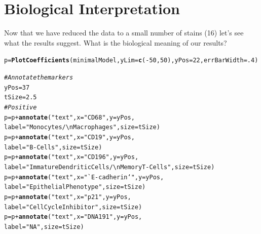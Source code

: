 \documentclass[a4paper]{article}\usepackage[]{graphicx}\usepackage[]{color}
\makeatletter
\newcommand{\hlnum}[1]{\textcolor[rgb]{0.686,0.059,0.569}{#1}}%
\newcommand{\hlstr}[1]{\textcolor[rgb]{0.192,0.494,0.8}{#1}}%
\newcommand{\hlcom}[1]{\textcolor[rgb]{0.678,0.584,0.686}{\textit{#1}}}%
\newcommand{\hlopt}[1]{\textcolor[rgb]{0,0,0}{#1}}%
\newcommand{\hlstd}[1]{\textcolor[rgb]{0.345,0.345,0.345}{#1}}%
\newcommand{\hlkwb}[1]{\textcolor[rgb]{0.69,0.353,0.396}{#1}}%
\newcommand{\hlkwc}[1]{\textcolor[rgb]{0.333,0.667,0.333}{#1}}%
\newcommand{\hlkwd}[1]{\textcolor[rgb]{0.737,0.353,0.396}{\textbf{#1}}}%
\newenvironment{kframe}{%
 \def\at@end@of@kframe{}%
 \ifinner\ifhmode%
  \def\at@end@of@kframe{\end{minipage}}%
  \begin{minipage}{\columnwidth}%
 \fi\fi%
 \def\FrameCommand##1{\hskip\@totalleftmargin \hskip-\fboxsep
 \colorbox{shadecolor}{##1}\hskip-\fboxsep
     \hskip-\linewidth \hskip-\@totalleftmargin \hskip\columnwidth}%
 \MakeFramed {\advance\hsize-\width
   \@totalleftmargin\z@ \linewidth\hsize
   \@setminipage}}%
 {\par\unskip\endMakeFramed%
 \at@end@of@kframe}
\newenvironment{knitrout}{}{} %
\makeatother
\begin{document}
\section{Biological Interpretation}
Now that we have reduced the data to a small number of stains (16) let's see what the results suggest. What is the biological meaning of our results?
\begin{knitrout}
\color{fgcolor}\begin{kframe}
\begin{alltt}
\hlstd{p} \hlkwb{=} \hlkwd{PlotCoefficients}\hlstd{(minimalModel,}\hlkwc{yLim}\hlstd{=}\hlkwd{c}\hlstd{(}\hlopt{-}\hlnum{50}\hlstd{,}\hlnum{50}\hlstd{),}\hlkwc{yPos}\hlstd{=}\hlnum{22}\hlstd{,}\hlkwc{errBarWidth}\hlstd{=}\hlnum{.4}\hlstd{)}

\hlcom{# Annotate the markers}
\hlstd{yPos} \hlkwb{=} \hlnum{37}
\hlstd{tSize} \hlkwb{=} \hlnum{2.5}
\hlcom{# Positive}
\hlstd{p} \hlkwb{=} \hlstd{p} \hlopt{+} \hlkwd{annotate}\hlstd{(}\hlstr{"text"}\hlstd{,} \hlkwc{x} \hlstd{=} \hlstr{"CD68"}\hlstd{,} \hlkwc{y} \hlstd{= yPos,}
                       \hlkwc{label} \hlstd{=} \hlstr{"Monocytes/\textbackslash{}n Macrophages"}\hlstd{,} \hlkwc{size} \hlstd{= tSize)}
\hlstd{p} \hlkwb{=} \hlstd{p} \hlopt{+} \hlkwd{annotate}\hlstd{(}\hlstr{"text"}\hlstd{,} \hlkwc{x} \hlstd{=} \hlstr{"CD19"}\hlstd{,} \hlkwc{y} \hlstd{= yPos,}
                       \hlkwc{label} \hlstd{=} \hlstr{"B-Cells"}\hlstd{,} \hlkwc{size} \hlstd{= tSize)}
\hlstd{p} \hlkwb{=} \hlstd{p} \hlopt{+} \hlkwd{annotate}\hlstd{(}\hlstr{"text"}\hlstd{,} \hlkwc{x} \hlstd{=} \hlstr{"CD196"}\hlstd{,} \hlkwc{y} \hlstd{= yPos,}
                       \hlkwc{label} \hlstd{=} \hlstr{"Immature Dendritic Cells/\textbackslash{}n Memory T-Cells"}\hlstd{,} \hlkwc{size} \hlstd{= tSize)}
\hlstd{p} \hlkwb{=} \hlstd{p} \hlopt{+} \hlkwd{annotate}\hlstd{(}\hlstr{"text"}\hlstd{,} \hlkwc{x} \hlstd{=} \hlstr{"`E-cadherin`"}\hlstd{,} \hlkwc{y} \hlstd{= yPos,}
                       \hlkwc{label} \hlstd{=} \hlstr{"Epithelial Phenotype"}\hlstd{,} \hlkwc{size} \hlstd{= tSize)}
\hlstd{p} \hlkwb{=} \hlstd{p} \hlopt{+} \hlkwd{annotate}\hlstd{(}\hlstr{"text"}\hlstd{,} \hlkwc{x} \hlstd{=} \hlstr{"p21"}\hlstd{,} \hlkwc{y} \hlstd{= yPos,}
                       \hlkwc{label} \hlstd{=} \hlstr{"Cell Cycle Inhibitor"}\hlstd{,} \hlkwc{size} \hlstd{= tSize)}
\hlstd{p} \hlkwb{=} \hlstd{p} \hlopt{+} \hlkwd{annotate}\hlstd{(}\hlstr{"text"}\hlstd{,} \hlkwc{x} \hlstd{=} \hlstr{"DNA191"}\hlstd{,} \hlkwc{y} \hlstd{= yPos,}
                       \hlkwc{label} \hlstd{=} \hlstr{"NA"}\hlstd{,} \hlkwc{size} \hlstd{= tSize)}

\end{alltt}
\end{kframe}
\end{knitrout}
\end{document}
